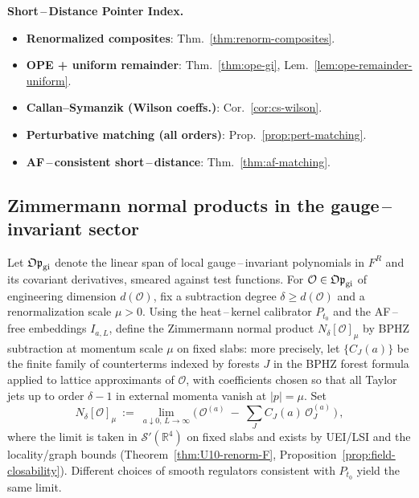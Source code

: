 \documentclass[11pt]{amsart}
\theoremstyle{plain}
\theoremstyle{definition}
\theoremstyle{remark}
\begin{document}
\begin{mdframed}[linewidth=0.6pt, linecolor=black!30, backgroundcolor=yellow!3, roundcorner=2pt, innertopmargin=6pt, innerbottommargin=6pt, skipabove=8pt, skipbelow=8pt]
\textbf{Short\,–\,Distance Pointer Index.}
\begin{itemize}[leftmargin=2em, itemsep=3pt]
  \item \textbf{Renormalized composites}: Thm.~\ref{thm:renorm-composites}.
  \item \textbf{OPE + uniform remainder}: Thm.~\ref{thm:ope-gi}, Lem.~\ref{lem:ope-remainder-uniform}.
  \item \textbf{Callan–Symanzik (Wilson coeffs.)}: Cor.~\ref{cor:cs-wilson}.
  \item \textbf{Perturbative matching (all orders)}: Prop.~\ref{prop:pert-matching}.
  \item \textbf{AF\,–\,consistent short\,–\,distance}: Thm.~\ref{thm:af-matching}.
\end{itemize}
\end{mdframed}

\subsection{Zimmermann normal products in the gauge\,–\,invariant sector}
Let $\mathfrak{Op}_{\rm gi}$ denote the linear span of local gauge\,–\,invariant polynomials in $F^R$ and its covariant derivatives, smeared against test functions. For $\mathcal O\in \mathfrak{Op}_{\rm gi}$ of engineering dimension $d(\mathcal O)$, fix a subtraction degree $\delta\ge d(\mathcal O)$ and a renormalization scale $\mu>0$. Using the heat\,–\,kernel calibrator $P_{t_0}$ and the AF\,–\,free embeddings $I_{a,L}$, define the Zimmermann normal product $N_\delta[\mathcal O]_\mu$ by BPHZ subtraction at momentum scale $\mu$ on fixed slabs: more precisely, let $\{C_J(a)\}$ be the finite family of counterterms indexed by forests $J$ in the BPHZ forest formula applied to lattice approximants of $\mathcal O$, with coefficients chosen so that all Taylor jets up to order $\delta-1$ in external momenta vanish at $|p|=\mu$. Set
\[
  N_\delta[\mathcal O]_\mu\ :=\ \lim_{a\downarrow 0,\,L\to\infty}\Big(\,\mathcal O^{(a)}\ -\ \sum_{J} C_J(a)\, \mathcal O^{(a)}_J\,\Big)\,,
\]
where the limit is taken in $\mathcal S'(\mathbb R^4)$ on fixed slabs and exists by UEI/LSI and the locality/graph bounds (Theorem~\ref{thm:U10-renorm-F}, Proposition~\ref{prop:field-closability}). Different choices of smooth regulators consistent with $P_{t_0}$ yield the same limit.
\end{document}
